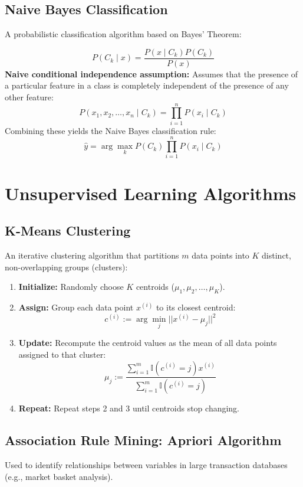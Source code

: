 \documentclass[12pt,a4paper]{article}
\begin{document}
\subsection{Naive Bayes Classification}
A probabilistic classification algorithm based on Bayes' Theorem:

\begin{tcolorbox}[formulabox, title={Bayes' Theorem and Naive Assumption}]
  $$P(C_k \mid x) = \frac{P(x \mid C_k) P(C_k)}{P(x)}$$
  \textbf{Naive conditional independence assumption:} Assumes that the presence of a particular feature in a class is completely independent of the presence of any other feature:
  $$P(x_1, x_2, \dots, x_n \mid C_k) = \prod_{i=1}^{n} P(x_i \mid C_k)$$
  Combining these yields the Naive Bayes classification rule:
  $$\hat{y} = \arg\max_{k} P(C_k) \prod_{i=1}^{n} P(x_i \mid C_k)$$
\end{tcolorbox}

\section{Unsupervised Learning Algorithms}

\subsection{K-Means Clustering}
An iterative clustering algorithm that partitions $m$ data points into $K$ distinct, non-overlapping groups (clusters):
\begin{enumerate}[leftmargin=*, itemsep=3pt]
  \item \textbf{Initialize:} Randomly choose $K$ centroids ($\mu_1, \mu_2, \dots, \mu_K$).
  \item \textbf{Assign:} Group each data point $x^{(i)}$ to its closest centroid:
    $$c^{(i)} := \arg\min_j ||x^{(i)} - \mu_j||^2$$
  \item \textbf{Update:} Recompute the centroid values as the mean of all data points assigned to that cluster:
    $$\mu_j := \frac{\sum_{i=1}^{m} \mathbb{I}(c^{(i)} = j) x^{(i)}}{\sum_{i=1}^{m} \mathbb{I}(c^{(i)} = j)}$$
  \item \textbf{Repeat:} Repeat steps 2 and 3 until centroids stop changing.
\end{enumerate}

\subsection{Association Rule Mining: Apriori Algorithm}
Used to identify relationships between variables in large transaction databases (e.g., market basket analysis).
\end{document}
